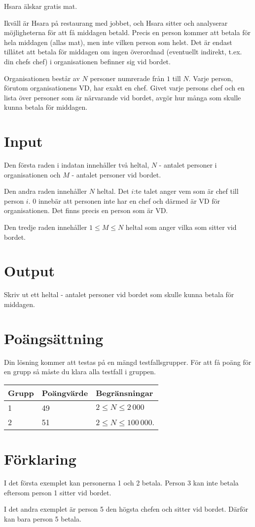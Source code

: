
Hsara älskar gratis mat.

Ikväll är Hsara på restaurang med jobbet, och Hsara sitter och analyserar möjligheterna för att få middagen betald. Precis en person kommer att betala för hela middagen (allas mat), men inte vilken person som helst. Det är endast tillåtet att betala för middagen om ingen överordnad (eventuellt indirekt, t.ex. din chefs chef) i organisationen befinner sig vid bordet.

Organisationen består av $N$ personer numrerade från $1$ till $N$. Varje person, förutom organisationens VD, har exakt en chef. Givet varje persons chef och en lista över personer som är närvarande vid bordet, avgör hur många som skulle kunna betala för middagen.

\section*{Input}

Den första raden i indatan innehåller två heltal, $N$ - antalet personer i organisationen och $M$ - antalet personer vid bordet.

Den andra raden innehåller $N$ heltal. Det $i$:te talet anger vem som är chef till person $i$. 0 innebär att personen inte har en chef och därmed är VD för organisationen. Det finns precis en person som är VD.

Den tredje raden innehåller $1 \le M \le N$ heltal som anger vilka som sitter vid bordet.

\section*{Output}
Skriv ut ett heltal - antalet personer vid bordet som skulle kunna betala för middagen.

\section*{Poängsättning}
Din lösning kommer att testas på en mängd testfallsgrupper. För att få poäng för en grupp så måste du klara alla testfall i gruppen.

\begin{tabular}{| l | l | l |}
	\hline
	Grupp & Poängvärde & Begränsningar\\ \hline
  1     & 49         & $2 \le N \le 2\,000$ \\ \hline
  2     & 51         & $2 \le N \le 100\,000$. \\ \hline
\end{tabular}

\section*{Förklaring}
I det första exemplet kan personerna 1 och 2 betala. Person 3 kan inte betala eftersom person 1 sitter vid bordet.

I det andra exemplet är person 5 den högsta chefen och sitter vid bordet. Därför kan bara person 5 betala.
